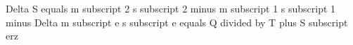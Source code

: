 Delta S equals m subscript 2 s subscript 2 minus m subscript 1 s subscript 1 minus Delta m subscript e s subscript e equals Q divided by T plus S subscript erz